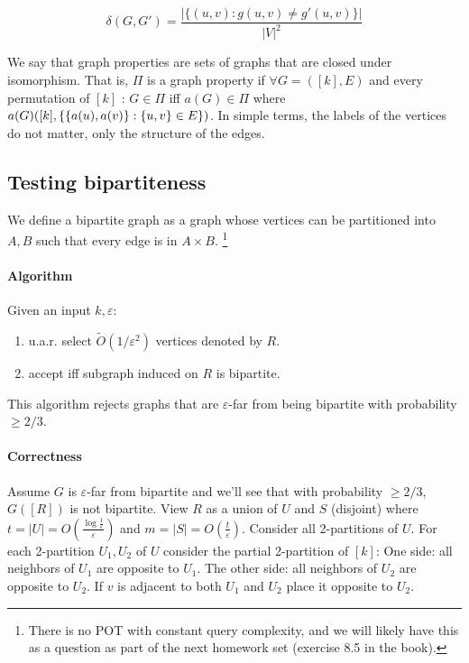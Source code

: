 \documentclass{idc_msc}
\let\defeq\relax
\newcommand\defeq{\stackrel{\mathclap{\normalfont\mbox{def}}}{=}}
\begin{document}
\[
  \delta(G, G') = \frac{|\{(u, v) : g(u, v) \ne g'(u, v)\}|}{|V|^2}
\]

We say that graph properties are sets of graphs that are closed under isomorphism.
That is, \(\Pi\) is a graph property if \(\forall G = ([k], E)\) and every permutation of \([k]\) : \(G \in \Pi\) iff \(a(G) \in \Pi\) where \(a(G) \defeq ([k], \{ \{a(u), a(v)\} : \{u, v\} \in E \})\).
In simple terms, the labels of the vertices do not matter, only the structure of the edges.

\subsection{Testing bipartiteness}

We define a bipartite graph as a graph whose vertices can be partitioned into \(A, B\) such that every edge is in \(A \times B\).
\footnote{There is no POT with constant query complexity, and we will likely have this as a question as part of the next homework set (exercise 8.5 in the book).}

\paragraph{Algorithm}

Given an input \(k, \varepsilon\):

\begin{enumerate}
  \item u.a.r. select \(\tilde{O}(1 / \varepsilon^2)\) vertices denoted by \(R\).
  \item accept iff subgraph induced on \(R\) is bipartite.
\end{enumerate}


This algorithm rejects graphs that are \(\varepsilon\)-far from being bipartite with probability \(\ge 2/3\).

\paragraph{Correctness}

Assume \(G\) is \(\varepsilon\)-far from bipartite and we'll see that with probability \(\ge 2/3\), \(G([R])\) is not bipartite.
View \(R\) as a union of \(U\) and \(S\) (disjoint) where \(t = |U| = O(\frac{\log\frac{1}{\varepsilon}}{\varepsilon})\) and \(m = |S| = O(\frac{t}{\varepsilon})\).
Consider all 2-partitions of \(U\).
For each 2-partition \(U_1, U_2\) of \(U\) consider the partial 2-partition of \([k]\):
One side: all neighbors of \(U_1\) are opposite to \(U_1\).
The other side: all neighbors of \(U_2\) are opposite to \(U_2\).
If \(v\) is adjacent to both \(U_1\) and \(U_2\) place it opposite to \(U_2\).
\end{document}
